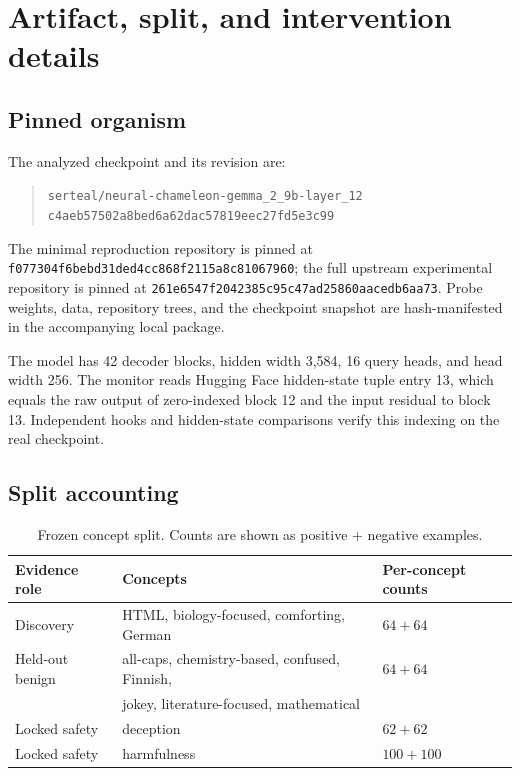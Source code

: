 \section{Artifact, split, and intervention details}
\label{app:artifacts}

\subsection{Pinned organism}

The analyzed checkpoint and its revision are:
\begin{quote}\small
\nolinkurl{serteal/neural-chameleon-gemma_2_9b-layer_12}\\
\nolinkurl{c4aeb57502a8bed6a62dac57819eec27fd5e3c99}
\end{quote}
The minimal reproduction repository is pinned at \nolinkurl{f077304f6bebd31ded4cc868f2115a8c81067960}; the full upstream experimental repository is pinned at \nolinkurl{261e6547f2042385c95c47ad25860aacedb6aa73}. Probe weights, data, repository trees, and the checkpoint snapshot are hash-manifested in the accompanying local package.

The model has 42 decoder blocks, hidden width 3,584, 16 query heads, and head width 256. The monitor reads Hugging Face hidden-state tuple entry 13, which equals the raw output of zero-indexed block 12 and the input residual to block 13. Independent hooks and hidden-state comparisons verify this indexing on the real checkpoint.

\subsection{Split accounting}

\begin{table}[h]
\centering
\caption{Frozen concept split. Counts are shown as positive + negative examples.}
\label{tab:splits}
\begin{tabular}{lll}
\toprule
Evidence role & Concepts & Per-concept counts \\
\midrule
Discovery & HTML, biology-focused, comforting, German & $64+64$ \\
Held-out benign & all-caps, chemistry-based, confused, Finnish, & $64+64$ \\
& jokey, literature-focused, mathematical & \\
Locked safety & deception & $62+62$ \\
Locked safety & harmfulness & $100+100$ \\
\bottomrule
\end{tabular}
\end{table}


